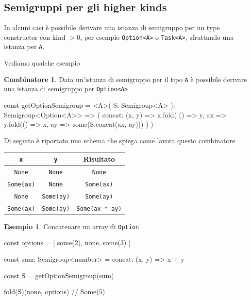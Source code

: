 \documentclass[12pt]{article}
\theoremstyle{definition}
\newtheorem{example}{Esempio}[section]
\newtheorem{combinator}{Combinatore}[section]
\newenvironment{code}
  {\vspace{0.5cm} \VerbatimEnvironment\begin{typescriptcode}}
  {\end{typescriptcode} \vspace{0.2cm}}
\begin{document}
\subsection{Semigruppi per gli higher kinds}

In alcuni casi è possibile derivare una istanza di semigruppo per un type constructor con kind $> 0$, per esempio \texttt{Option<A>} o \texttt{Task<A>},
sfruttando una istanza per \texttt{A}.

Vediamo qualche esempio

\begin{combinator}
Data un'istanza di semigruppo per il tipo \texttt{A} è possibile derivare una istanza di semigruppo per \texttt{Option<A>}

\begin{code}
const getOptionSemigroup = <A>(
  S: Semigroup<A>
): Semigroup<Option<A>> => ({
  concat: (x, y) =>
    x.fold(
      () => y,
      ax => y.fold(() => x, ay => some(S.concat(ax, ay)))
    )
})
\end{code}

Di seguito è riportato uno schema che spiega come lavora questo combinatore

\begin{center}
\bgroup
\def\arraystretch{1.5}
\begin{tabular}{ |c|c|c| }
\hline
\texttt{x} & \texttt{y} & Risultato \\
\hline
\texttt{None} & \texttt{None} & \texttt{None} \\
\hline
\texttt{Some(ax)} & \texttt{None} & \texttt{Some(ax)} \\
\hline
\texttt{None} & \texttt{Some(ay)} & \texttt{Some(ay)} \\
\hline
\texttt{Some(ax)} & \texttt{Some(ay)} & \texttt{Some(ax * ay)} \\
\hline
\end{tabular}
\egroup
\end{center}
\end{combinator}

\begin{example}
Concatenare un array di \texttt{Option}

\begin{code}
const options = [
  some(2),
  none,
  some(3)
]

const sum: Semigroup<number> = {
  concat: (x, y) => x + y
}

const S = getOptionSemigroup(sum)

fold(S)(none, options) // Some(5)
\end{code}
\end{example}
\end{document}
